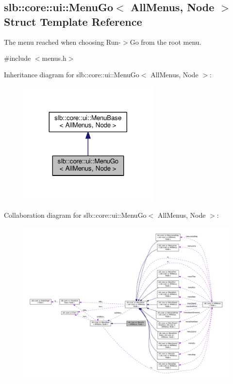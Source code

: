 \hypertarget{structslb_1_1core_1_1ui_1_1MenuGo}{}\subsection{slb\+:\+:core\+:\+:ui\+:\+:Menu\+Go$<$ All\+Menus, Node $>$ Struct Template Reference}
\label{structslb_1_1core_1_1ui_1_1MenuGo}


The menu reached when choosing Run-\/$>$Go from the root menu.  




{\ttfamily \#include $<$menus.\+h$>$}



Inheritance diagram for slb\+:\+:core\+:\+:ui\+:\+:Menu\+Go$<$ All\+Menus, Node $>$\+:\nopagebreak
\begin{figure}[H]
\begin{center}
\leavevmode
\includegraphics[width=200pt]{structslb_1_1core_1_1ui_1_1MenuGo__inherit__graph}
\end{center}
\end{figure}


Collaboration diagram for slb\+:\+:core\+:\+:ui\+:\+:Menu\+Go$<$ All\+Menus, Node $>$\+:\nopagebreak
\begin{figure}[H]
\begin{center}
\leavevmode
\includegraphics[width=350pt]{structslb_1_1core_1_1ui_1_1MenuGo__coll__graph}
\end{center}
\end{figure}
